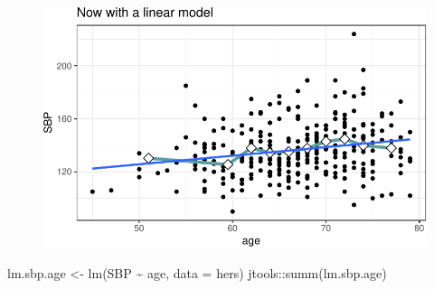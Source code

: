 \documentclass[
  letterpaper,
  DIV=11,
  numbers=noendperiod]{scrreport}
\newenvironment{Shaded}{\begin{snugshade}}{\end{snugshade}}
\newcommand{\AttributeTok}[1]{\textcolor[rgb]{0.40,0.45,0.13}{#1}}
\newcommand{\FunctionTok}[1]{\textcolor[rgb]{0.28,0.35,0.67}{#1}}
\newcommand{\NormalTok}[1]{\textcolor[rgb]{0.00,0.23,0.31}{#1}}
\newcommand{\OtherTok}[1]{\textcolor[rgb]{0.00,0.23,0.31}{#1}}
\newcommand{\SpecialCharTok}[1]{\textcolor[rgb]{0.37,0.37,0.37}{#1}}
\begin{document}
\begin{figure}[H]

{\centering \includegraphics{week1/week1_files/figure-pdf/unnamed-chunk-4-3.pdf}

}

\end{figure}

\begin{Shaded}
\begin{Highlighting}[]
\NormalTok{lm.sbp.age }\OtherTok{\textless{}{-}} \FunctionTok{lm}\NormalTok{(SBP }\SpecialCharTok{\textasciitilde{}}\NormalTok{ age, }\AttributeTok{data =}\NormalTok{ hers)}
\NormalTok{jtools}\SpecialCharTok{::}\FunctionTok{summ}\NormalTok{(lm.sbp.age)}
\end{Highlighting}
\end{Shaded}
\end{document}
